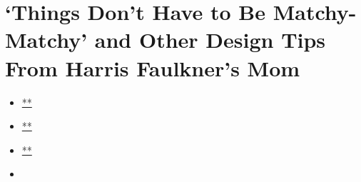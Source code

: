 \hypertarget{things-dont-have-to-be-matchy-matchy-and-other-design-tips-from-harris-faulkners-mom}{%
\section{`Things Don't Have to Be Matchy-Matchy' and Other Design Tips
From Harris Faulkner's
Mom}\label{things-dont-have-to-be-matchy-matchy-and-other-design-tips-from-harris-faulkners-mom}}

\begin{itemize}
\item
  \href{https://www.facebook.com/sharer.php?app_id=9869919170\&u=https\%3A\%2F\%2Fwww.nytimes.com\%2Fslideshow\%2F2020\%2F08\%2F04\%2Frealestate\%2Fthings-dont-have-to-be-matchy-matchy-and-other-design-tips-from-harris-faulkners-mom.html\%3Fsmid\%3Dfb-share\&name=\%E2\%80\%98Things\%20Don\%E2\%80\%99t\%20Have\%20to\%20Be\%20Matchy-Matchy\%E2\%80\%99\%20and\%20Other\%20Design\%20Tips\%20From\%20Harris\%20Faulkner\%E2\%80\%99s\%20Mom\&redirect_uri=https\%3A\%2F\%2Fwww.facebook.com\%2F}{**}
\item
  \href{https://twitter.com/intent/tweet?url=https\%3A\%2F\%2Fwww.nytimes.com\%2Fslideshow\%2F2020\%2F08\%2F04\%2Frealestate\%2Fthings-dont-have-to-be-matchy-matchy-and-other-design-tips-from-harris-faulkners-mom.html\%3Fsmid\%3Dtw-share\&text=\%E2\%80\%98Things\%20Don\%E2\%80\%99t\%20Have\%20to\%20Be\%20Matchy-Matchy\%E2\%80\%99\%20and\%20Other\%20Design\%20Tips\%20From\%20Harris\%20Faulkner\%E2\%80\%99s\%20Mom}{**}
\item
  \href{mailto:?subject=NYTimes.com\%3A\%20\%E2\%80\%98Things\%20Don\%E2\%80\%99t\%20Have\%20to\%20Be\%20Matchy-Matchy\%E2\%80\%99\%20and\%20Other\%20Design\%20Tips\%20From\%20Harris\%20Faulkner\%E2\%80\%99s\%20Mom\&body=From\%20The\%20New\%20York\%20Times\%3A\%0A\%0A\%E2\%80\%98Things\%20Don\%E2\%80\%99t\%20Have\%20to\%20Be\%20Matchy-Matchy\%E2\%80\%99\%20and\%20Other\%20Design\%20Tips\%20From\%20Harris\%20Faulkner\%E2\%80\%99s\%20Mom\%0A\%0AThe\%20Fox\%20News\%20anchor\%E2\%80\%99s\%20mother\%20gave\%20her\%20some\%20decorating\%20advice\%3A\%20\%E2\%80\%98Just\%20make\%20it\%20beautiful.\%E2\%80\%99\%20And\%20she\%E2\%80\%99s\%20been\%20trying.\%0A\%0Ahttps\%3A\%2F\%2Fwww.nytimes.com\%2Fslideshow\%2F2020\%2F08\%2F04\%2Frealestate\%2Fthings-dont-have-to-be-matchy-matchy-and-other-design-tips-from-harris-faulkners-mom.html\%3Fsmid\%3Dem-share}{**}
\item
\end{itemize}

